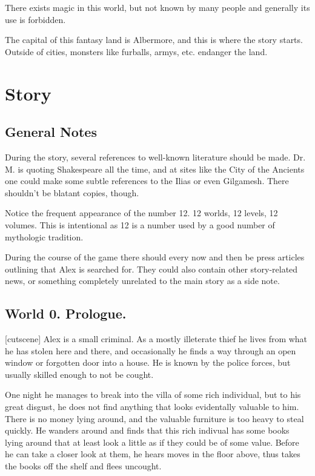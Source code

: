 \documentclass{gd-document}
\newcommand\DrM{Dr.\,M.\xspace}
\begin{document}
There exists magic in this world, but not known by many people and
generally its use is forbidden.

The capital of this fantasy land is Albermore, and this is where the
story starts. Outside of cities, monsters like furballs, armys,
etc. endanger the land.

\section{Story}

\subsection{General Notes}

During the story, several references to well-known literature should
be made. \DrM is quoting Shakespeare all the time, and at sites like
the City of the Ancients one could make some subtle references to the
Ilias or even Gilgamesh. There shouldn’t be blatant copies, though.

Notice the frequent appearance of the number 12. 12 worlds, 12 levels,
12 volumes. This is intentional as 12 is a number used by a good
number of mythologic tradition.

During the course of the game there should every now and then be press
articles outlining that Alex is searched for. They could also contain
other story-related news, or something completely unrelated to the
main story as a side note.

\subsection{World 0. Prologue.}

[cutscene]
Alex is a small criminal. As a mostly illeterate thief he lives from
what he has stolen here and there, and occasionally he finds a way
through an open window or forgotten door into a house. He is known by
the police forces, but usually skilled enough to not be cought.

One night he manages to break into the villa of some rich individual,
but to his great disgust, he does not find anything that looks
evidentally valuable to him. There is no money lying around, and the
valuable furniture is too heavy to steal quickly. He wanders around
and finds that this rich indivual has some books lying around that at
least look a little as if they could be of some value. Before he can
take a closer look at them, he hears moves in the floor above, thus
takes the books off the shelf and flees uncought.
\end{document}
